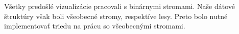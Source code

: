 Všetky predošlé vizualizácie pracovali s binárnymi stromami. Naše dátové 
štruktúry však boli všeobecné stromy, respektíve lesy. Preto bolo nutné 
implementovať triedu na prácu so všeobecnými stromami.

